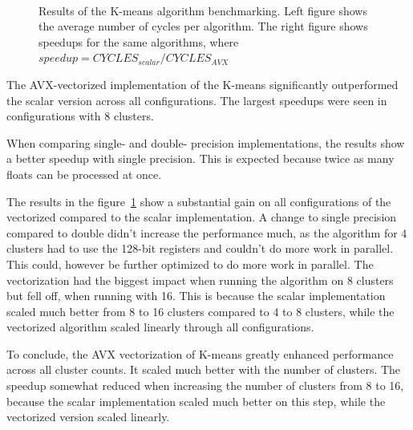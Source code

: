 \documentclass[10pt]{article}
\begin{document}
\begin{figure}[htbp]
    \centering
    \hfill
    \\
    \caption{Results of the K-means algorithm benchmarking. Left figure shows the average number of cycles per algorithm. The right figure shows speedups for the same algorithms, where $speedup = CYCLES_{scalar} / CYCLES_{AVX}$}
    \label{fig:task2:speedup}
\end{figure}

The AVX-vectorized implementation of the K-means significantly outperformed the scalar version across all configurations. The largest speedups were seen in configurations with 8 clusters.

When comparing single- and double- precision implementations, the results show a better speedup with single precision. This is expected because twice as many floats can be processed at once.

The results in the figure~\ref{fig:task2:speedup} show a substantial gain on all configurations of the vectorized compared to the scalar implementation. A change to single precision compared to double didn't increase the performance much, as the algorithm for 4 clusters had to use the 128-bit registers and couldn't do more work in parallel. This could, however be further optimized to do more work in parallel. The vectorization had the biggest impact when running the algorithm on 8 clusters but fell off, when running with 16. This is because the scalar implementation scaled much better from 8 to 16 clusters compared to 4 to 8 clusters, while the vectorized algorithm scaled linearly through all configurations.

To conclude, the AVX vectorization of K-means greatly enhanced performance across all cluster counts. It scaled much better with the number of clusters. The speedup somewhat reduced when increasing the number of clusters from 8 to 16, because the scalar implementation scaled much better on this step, while the vectorized version scaled linearly.
\end{document}
